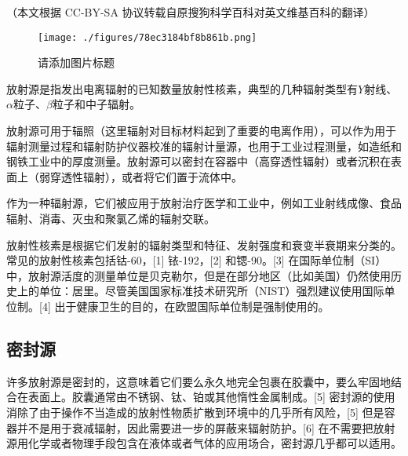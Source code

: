 
（本文根据 CC-BY-SA 协议转载自原搜狗科学百科对英文维基百科的翻译）

\begin{figure}[ht]
\centering
\texttt{[image: ./figures/78ec3184bf8b861b.png]}
\caption{请添加图片标题} \label{fig_FSY_3}
\end{figure}

放射源是指发出电离辐射的已知数量放射性核素，典型的几种辐射类型有$Y$射线、$\alpha$粒子、$\beta$粒子和中子辐射。

放射源可用于辐照（这里辐射对目标材料起到了重要的电离作用），可以作为用于辐射测量过程和辐射防护仪器校准的辐射计量源，也用于工业过程测量，如造纸和钢铁工业中的厚度测量。放射源可以密封在容器中（高穿透性辐射）或者沉积在表面上（弱穿透性辐射），或者将它们置于流体中。

作为一种辐射源，它们被应用于放射治疗医学和工业中，例如工业射线成像、食品辐射、消毒、灭虫和聚氯乙烯的辐射交联。

放射性核素是根据它们发射的辐射类型和特征、发射强度和衰变半衰期来分类的。常见的放射性核素包括钴-60，[1] 铱-192，[2] 和锶-90。[3] 在国际单位制（SI）中，放射源活度的测量单位是贝克勒尔，但是在部分地区（比如美国）仍然使用历史上的单位：居里。尽管美国国家标准技术研究所（NIST）强烈建议使用国际单位制。[4] 出于健康卫生的目的，在欧盟国际单位制是强制使用的。

\subsection{密封源}
许多放射源是密封的，这意味着它们要么永久地完全包裹在胶囊中，要么牢固地结合在表面上。胶囊通常由不锈钢、钛、铂或其他惰性金属制成。[5] 密封源的使用消除了由于操作不当造成的放射性物质扩散到环境中的几乎所有风险，[5] 但是容器并不是用于衰减辐射，因此需要进一步的屏蔽来辐射防护。[6] 在不需要把放射源用化学或者物理手段包含在液体或者气体的应用场合，密封源几乎都可以适用。

